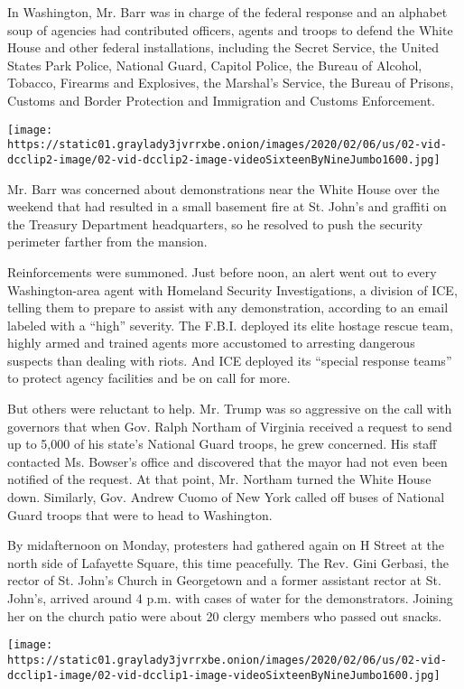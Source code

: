 In Washington, Mr. Barr was in charge of the federal response and an
alphabet soup of agencies had contributed officers, agents and troops to
defend the White House and other federal installations, including the
Secret Service, the United States Park Police, National Guard, Capitol
Police, the Bureau of Alcohol, Tobacco, Firearms and Explosives, the
Marshal's Service, the Bureau of Prisons, Customs and Border Protection
and Immigration and Customs Enforcement.

\texttt{[image: https://static01.graylady3jvrrxbe.onion/images/2020/02/06/us/02-vid-dcclip2-image/02-vid-dcclip2-image-videoSixteenByNineJumbo1600.jpg]}

Mr. Barr was concerned about demonstrations near the White House over
the weekend that had resulted in a small basement fire at St. John's and
graffiti on the Treasury Department headquarters, so he resolved to push
the security perimeter farther from the mansion.

Reinforcements were summoned. Just before noon, an alert went out to
every Washington-area agent with Homeland Security Investigations, a
division of ICE, telling them to prepare to assist with any
demonstration, according to an email labeled with a ``high'' severity.
The F.B.I. deployed its elite hostage rescue team, highly armed and
trained agents more accustomed to arresting dangerous suspects than
dealing with riots. And ICE deployed its ``special response teams'' to
protect agency facilities and be on call for more.

But others were reluctant to help. Mr. Trump was so aggressive on the
call with governors that when Gov. Ralph Northam of Virginia received a
request to send up to 5,000 of his state's National Guard troops, he
grew concerned. His staff contacted Ms. Bowser's office and discovered
that the mayor had not even been notified of the request. At that point,
Mr. Northam turned the White House down. Similarly, Gov. Andrew Cuomo of
New York called off buses of National Guard troops that were to head to
Washington.

By midafternoon on Monday, protesters had gathered again on H Street at
the north side of Lafayette Square, this time peacefully. The Rev. Gini
Gerbasi, the rector of St. John's Church in Georgetown and a former
assistant rector at St. John's, arrived around 4 p.m. with cases of
water for the demonstrators. Joining her on the church patio were about
20 clergy members who passed out snacks.

\texttt{[image: https://static01.graylady3jvrrxbe.onion/images/2020/02/06/us/02-vid-dcclip1-image/02-vid-dcclip1-image-videoSixteenByNineJumbo1600.jpg]}

